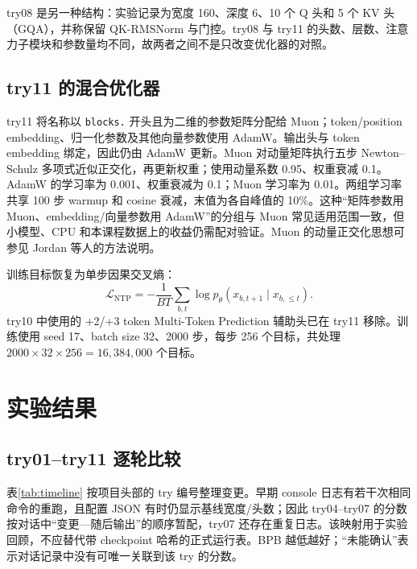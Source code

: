 \documentclass[UTF8,a4paper,11pt]{ctexart}
\begin{document}
try08 是另一种结构：实验记录为宽度 160、深度 6、10 个 Q 头和 5 个 KV 头（GQA），并称保留 QK-RMSNorm 与门控。try08 与 try11 的头数、层数、注意力子模块和参数量均不同，故两者之间不是只改变优化器的对照。

\subsection{try11 的混合优化器}
try11 将名称以 \texttt{blocks.} 开头且为二维的参数矩阵分配给 Muon；token/position embedding、归一化参数及其他向量参数使用 AdamW。输出头与 token embedding 绑定，因此仍由 AdamW 更新。Muon 对动量矩阵执行五步 Newton--Schulz 多项式近似正交化，再更新权重；使用动量系数 0.95、权重衰减 0.1。AdamW 的学习率为 0.001、权重衰减为 0.1；Muon 学习率为 0.01。两组学习率共享 100 步 warmup 和 cosine 衰减，末值为各自峰值的 10\%。这种“矩阵参数用 Muon、embedding/向量参数用 AdamW”的分组与 Muon 常见适用范围一致，但小模型、CPU 和本课程数据上的收益仍需配对验证。Muon 的动量正交化思想可参见 Jordan 等人的方法说明\cite{muon}。

训练目标恢复为单步因果交叉熵：
\[
  \mathcal{L}_{\mathrm{NTP}}=-\frac{1}{BT}\sum_{b,t}
  \log p_\theta(x_{b,t+1}\mid x_{b,\le t}).
\]
try10 中使用的 +2/+3 token Multi-Token Prediction 辅助头已在 try11 移除。训练使用 seed 17、batch size 32、2000 步，每步 256 个目标，共处理 $2000\times32\times256=16{,}384{,}000$ 个目标。

\section{实验结果}
\subsection{try01--try11 逐轮比较}
表\ref{tab:timeline} 按项目头部的 try 编号整理变更。早期 console 日志有若干次相同命令的重跑，且配置 JSON 有时仍显示基线宽度/头数；因此 try04--try07 的分数按对话中“变更—随后输出”的顺序暂配，try07 还存在重复日志。该映射用于实验回顾，不应替代带 checkpoint 哈希的正式运行表。BPB 越低越好；“未能确认”表示对话记录中没有可唯一关联到该 try 的分数。
\end{document}
